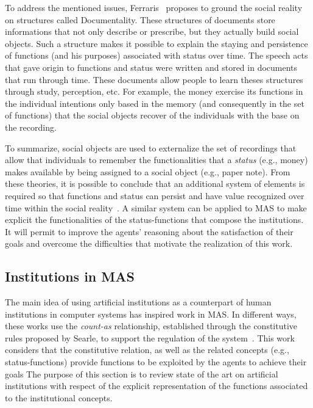 \documentclass[runningheads]{llncs}
\begin{document}
To address the mentioned issues, Ferraris~\cite{condello2018two,condello2019money} proposes to ground the social reality on structures
called Documentality. These structures of documents store informations that not only describe or prescribe, but they actually build social objects. 
Such a structure makes it possible to explain the staying and persistence of functions (and his purposes) associated with status over time. The speech acts that gave origin to functions and status were written and stored in documents that run through time. These documents allow people to learn theses structures through study, perception, etc.
For example, the money exercise its functions in the individual intentions only based in the memory (and consequently in the set of functions) that the social objects recover of the individuals with the base on the recording. 


To summarize, social objects are used to externalize the set of recordings that allow that individuals to remember the functionalities that a \emph{status} (e.g., money) makes available by being assigned to a social object (e.g., paper note).
From these theories, it is possible to conclude that an additional system of elements is required so that functions and status can persist and have value recognized over time within the social reality~\cite{condello2018two}.
A similar system can be applied to MAS to make explicit the functionalities of the status-functions that compose the institutions.
It will permit to improve the agents' reasoning about the satisfaction of their goals and overcome the difficulties that motivate the realization of this work.

\subsection{Institutions in MAS}
\label{institution_MAS}

The main idea of using artificial institutions as a counterpart of human institutions in computer systems has inspired work in MAS. In different ways, these works use the \textit{count-as} relationship, established through the constitutive rules proposed by Searle, to support the regulation of the system~\cite{Brito2016}. 
This work considers that the constitutive relation, as well as the related concepts (e.g., status-functions) provide functions to be exploited by the agents to achieve their goals
The purpose of this section is to review state of the art on artificial institutions with respect of the explicit representation of the functions associated to the institutional concepts.
\end{document}
